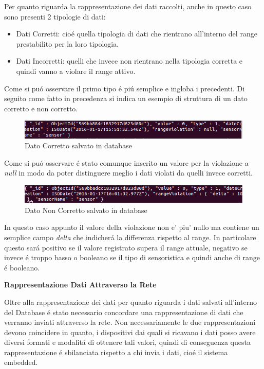 Per quanto riguarda la rappresentazione dei dati raccolti, anche in questo caso sono presenti 2 tipologie di dati:
\begin{itemize}
\item Dati Corretti: cio\'e quella tipologia di dati che rientrano all'interno del range prestabilito per la loro tipologia.
\item Dati Incorretti: quelli che invece non rientrano nella tipologia corretta e quindi vanno a violare il range attivo.
\end{itemize}

Come si pu\'o osservare il primo tipo \'e pi\'u semplice e ingloba i precedenti. Di seguito come fatto in precedenza si indica un esempio di struttura di un dato corretto e non corretto.

\begin{figure}[ht]
\centering
\includegraphics[scale=0.5,natwidth=610,natheight=642]{Figures/DataStructures/DataNoViolation.png}
\caption{Dato Corretto salvato in database}
\end{figure}

Come si pu\'o osservare \'e stato comunque inserito un valore per la violazione a \textit{null} in modo da poter distinguere meglio i dati violati da quelli invece corretti.

\begin{figure}[ht]
\centering
\includegraphics[scale=0.5,natwidth=610,natheight=642]{Figures/DataStructures/DataViolation.png}
\caption{Dato Non Corretto salvato in database}
\end{figure}

In questo caso appunto il valore della violazione non e' piu' nullo ma contiene un semplice campo \textit{delta} che indicher\'a la differenza rispetto al range. In particolare questo sar\'a positivo se il valore registrato supera il range attuale, negativo se invece \'e troppo basso o booleano se il tipo di sensoristica e quindi anche di range \'e booleano.

\begin{center}
  \textbf{Rappresentazione Dati Attraverso la Rete}
\end{center}

Oltre alla rappresentazione dei dati per quanto riguarda i dati salvati all'interno del Database \'e stato necessario concordare una rappresentazione di dati che verranno inviati attraverso la rete. Non necessariamente le due rappresentazioni devono coincidere in quanto, i dispositivi dai quali si ricavano i dati posso avere diversi formati e modalit\'a di ottenere tali valori, quindi di conseguenza questa rappresentazione \'e sbilanciata rispetto a chi invia i dati, cio\'e il sistema embedded.

